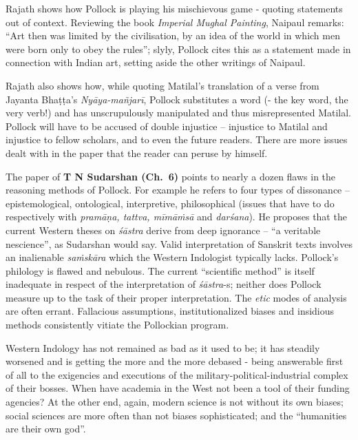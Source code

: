 Rajath shows how Pollock is playing his mischievous game - quoting statements out of context. Reviewing the book {\sl Imperial Mughal Painting}, Naipaul remarks: “Art then was limited by the civilisation, by an idea of the world in which men were born only to obey the rules”; slyly, Pollock cites this as a statement made in connection with Indian art, setting aside the other writings of Naipaul.

Rajath also shows how, while quoting Matilal’s translation of a verse from Jayanta Bhaṭṭa’s {\sl Nyāya-mañjarī}, Pollock substitutes a word (- the key word, the very verb!) and has unscrupulously manipulated and thus misrepresented Matilal. Pollock will have to be accused of double injustice -- injustice to Matilal and injustice to fellow scholars, and to even the future readers. There are more issues dealt with in the paper that the reader can peruse by himself.
\vskip 5pt

The paper of {\bf T N Sudarshan (Ch.~6)} points to nearly a dozen flaws in the reasoning methods of Pollock. For example he refers to four types of dissonance -- epistemological, ontological, interpretive, philosophical (issues that have to do respectively with {\sl pramāṇa, tattva, mīmāṁsā} and {\sl darśana}). He proposes that the current Western theses on {\sl śāstra} derive from deep ignorance -- “a veritable nescience”, as Sudarshan would say. Valid interpretation of Sanskrit texts involves an inalienable {\sl saṁskāra} which the Western Indologist typically lacks. Pollock’s philology is flawed and nebulous. The current “scientific method” is itself inadequate in respect of the interpretation of {\sl śāstra}-s; neither does Pollock measure up to the task of their proper interpretation. The {\sl etic} modes of analysis are often errant. Fallacious assumptions, institutionalized biases and insidious methods consistently vitiate the Pollockian program.

Western Indology has not remained as bad as it used to be; it has steadily worsened and is getting the more and the more debased - being answerable first of all to the exigencies and executions of the military-political-industrial complex of their bosses. When have academia in the West not been a tool of their funding agencies? At the other end, again, modern science is not without its own biases; social sciences are more often than not biases sophisticated; and the “humanities are their own god”.

